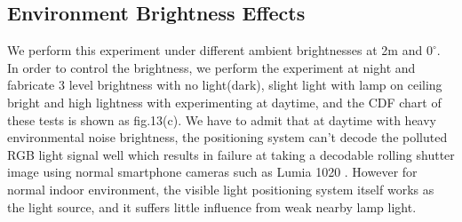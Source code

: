 \documentclass[conference]{IEEEtran}
\begin{document}
\subsection{\textbf{Environment Brightness Effects}}
We perform this experiment under different ambient brightnesses at 2m and $0^{\circ}$. In order to control the brightness, we perform the experiment at night and fabricate 3 level brightness with no light(dark), slight light with lamp on ceiling bright and high lightness with experimenting at daytime, and the CDF chart of these tests is shown as fig.13(c). We have to admit that at daytime with heavy environmental noise brightness, the positioning system can't decode the polluted RGB light signal well which results in failure at taking a decodable rolling shutter image using normal smartphone cameras such as Lumia 1020 . However for normal indoor environment, the visible light positioning system itself works as the light source, and it suffers little influence from weak nearby lamp light. 

\begin{figure}
	\footnotesize
\end{figure}
\end{document}
